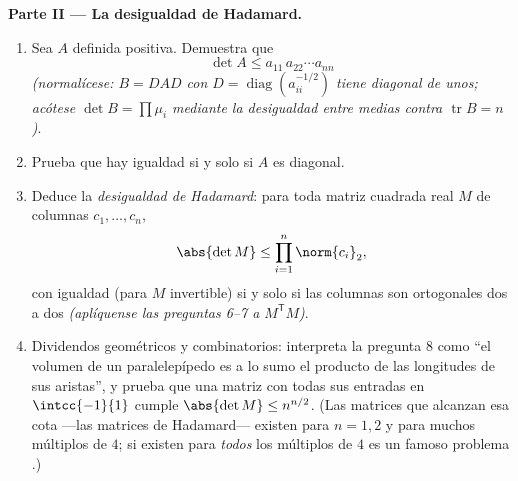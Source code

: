 \begin{problem}
\medskip
\noindent\textbf{Parte II --- La desigualdad de Hadamard.}
\begin{enumerate}[resume]
  \item Sea $A$ definida positiva. Demuestra que
        \[
        \det A \leq a_{11}\,a_{22}\cdots a_{nn}
        \]
        \emph{(normalícese: $B = DAD$ con $D =
        \operatorname{diag}(a_{ii}^{-1/2})$ tiene diagonal de unos;
        acótese $\det B = \prod \mu_i$ mediante la desigualdad entre
        medias contra $\operatorname{tr} B = n$)}.
  \item Prueba que hay igualdad si y solo si $A$ es diagonal.
  \item Deduce la \emph{desigualdad de Hadamard}: para toda matriz
        cuadrada real $M$ de columnas $c_1, \dots, c_n$,
        \[
        \abs{\det M} \leq \prod_{i=1}^{n}\norm{c_i}_2 ,
        \]
        con igualdad (para $M$ invertible) si y solo si las columnas
        son ortogonales dos a dos \emph{(aplíquense las preguntas
        6--7 a $M^{\mathsf T}M$)}.
  \item Dividendos geométricos y combinatorios: interpreta la
        pregunta 8 como ``el volumen de un paralelepípedo es a lo
        sumo el producto de las longitudes de sus aristas'', y
        prueba que una matriz con todas sus entradas en
        $\intcc{-1}{1}$ cumple $\abs{\det M} \leq n^{n/2}$. (Las
        matrices que alcanzan esa cota ---las matrices de
        Hadamard--- existen para $n = 1, 2$ y para muchos múltiplos
        de $4$; si existen para \emph{todos} los múltiplos de $4$ es
        un famoso problema .)
\end{enumerate}


\end{problem}
